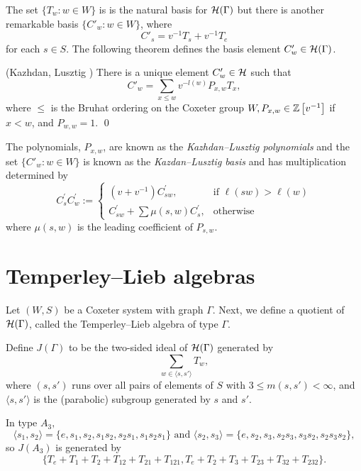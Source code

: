 The set $\{ T_{w}:w\in W\}$ is is the natural basis for $\mathcal{H}(\Gamma)$ but there is another remarkable basis $\{C'_w:w\in W\}$, where 
\[
C'_s=v^{-1}T_s+v^{-1}T_{e}
\]
for each $s\in S$. The following theorem defines the basis element $C'_w\in \mathcal{H}(\Gamma)$. 

\begin{theorem}
{\rm (Kazhdan, Lusztig \cite{Kazhdan1979})} There is a unique element $C'_{w}\in \mathcal{H}$ such that 
\[
C'_{w}=\sum_{x\le w}v^{-l(w)}P_{x,w}T_{x},
\]
where $\le$ is the Bruhat ordering on the Coxeter group $W, P_{x,w}\in\mathbb{Z} \left[v^{-1}\right]$ if $x<w$, and $P_{w,w}=1.$
\qed
\end{theorem}

The polynomials, $P_{x,w}$, are known as the \emph{Kazhdan--Lusztig polynomials} and the set $\{C'_{w}:w\in W\}$ is known as the \emph{Kazdan--Lusztig basis} and has multiplication determined by
\[
C^{\prime}_{s}C^{\prime}_{w}:=
\begin{cases}
\left(v+v^{-1}\right)C^{\prime}_{sw}, & \text{if }\ell\left(sw\right)>\ell\left(w\right)\\
C^{\prime}_{sw}+\sum \mu \left(s,w\right) C^{\prime}_{s}, & \text{otherwise }
\end{cases}
\]
where $\mu \left(s,w\right)$ is the leading coefficient of $P_{s,w}$.

\section{Temperley--Lieb algebras}\label{sec:TL}

Let $(W,S)$ be a Coxeter system with graph $\Gamma$. Next, we define a quotient of $\mathcal{H}(\Gamma)$, called the Temperley--Lieb algebra of type $\Gamma$.  

Define $J(\Gamma)$ to be
the two-sided ideal of $\mathcal{H}(\Gamma)$ generated by 
\[
\sum_{w\in\langle s,s'\rangle}T_{w},
\]
where $(s,s')$ runs over all pairs of elements of $S$ with $3\leq m(s,s')<\infty$,
and $\langle s,s'\rangle$ is the (parabolic) subgroup generated by
$s$ and $s'$.

\begin{example}
\rm In type $A_{3},$ 
\[
\langle s_{1},s_{2}\rangle=\{e,s_{1},s_{2},s_{1}s_{2},s_{2}s_{1},s_{1}s_{2}s_{1}\} \text{ and } \langle s_{2},s_{3}\rangle=\{e,s_{2},s_{3},s_{2}s_{3},s_{3}s_{2},s_{2}s_{3}s_{2}\},
\]
 so $J(A_3)$ is generated by
\[
\{T_{e}+T_{1}+T_{2}+T_{12}+T_{21}+T_{121}, T_{e}+T_{2}+T_{3}+T_{23}+T_{32}+T_{232}\}.
\]
\end{example}

